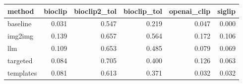 \begin{tabular}{lrrrrr}
\toprule
method & bioclip & bioclip2_tol & bioclip_tol & openai_clip & siglip \\
\midrule
baseline & 0.031 & 0.547 & 0.219 & 0.047 & 0.000 \\
img2img & 0.139 & 0.657 & 0.564 & 0.172 & 0.106 \\
llm & 0.109 & 0.653 & 0.485 & 0.079 & 0.069 \\
targeted & 0.084 & 0.705 & 0.400 & 0.126 & 0.063 \\
templates & 0.081 & 0.613 & 0.371 & 0.032 & 0.032 \\
\bottomrule
\end{tabular}
